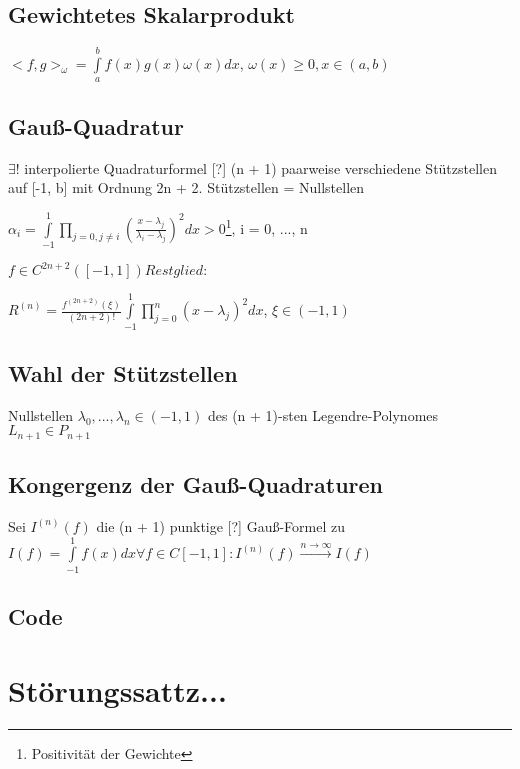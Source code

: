 \documentclass[12pt,a4paper]{article} %
\newcommand*\tab[1][1cm]{\hspace*{#1}}
\begin{document}
	\subsection{Gewichtetes Skalarprodukt}
	
	$<f, g>_\omega = \int\limits_a^bf(x)g(x)\omega(x)dx$, \tab $\omega(x)\ge 0, x \in (a, b)$
	
	\subsection{Gauß-Quadratur}
	
	$\exists!$ interpolierte Quadraturformel [?] (n + 1) paarweise verschiedene Stützstellen auf [-1, b] mit Ordnung 2n + 2. Stützstellen = Nullstellen
	
	$\alpha_i = \int\limits_{-1}^1\prod\limits_{j = 0, j \ne i}(\frac{x - \lambda_j}{\lambda_i - \lambda_j})^2 dx > 0$\footnote{Positivität der Gewichte}, \tab i = 0, ..., n
	
	$f\in C^{2n + 2}([-1, 1]) Restglied:$
		
	$R^{(n)} = \frac{f^{(2n + 2)}(\xi)}{(2n + 2)!}\int\limits_{-1}^1\prod\limits_{j = 0}^n(x - \lambda_j)^2dx$, \tab $\xi \in (-1 , 1)$
		
	\subsection{Wahl der Stützstellen}
	
	Nullstellen $\lambda_0, ..., \lambda_n \in(-1, 1)$ des (n + 1)-sten Legendre-Polynomes $L_{n + 1} \in P_{n + 1}$
	
	
	\subsection{Kongergenz der Gauß-Quadraturen}
	
	Sei $I^{(n)}(f)$ die (n + 1) punktige [?] Gauß-Formel zu $I(f) = \int\limits_{-1}^1f(x)dx \forall f \in C[-1, 1]: I^{(n)}(f) \xrightarrow{n \rightarrow \infty} I(f)$
	
	\subsection{Code}
	
	\newpage
	
	\section{Störungssattz...}
	
\end{document}
